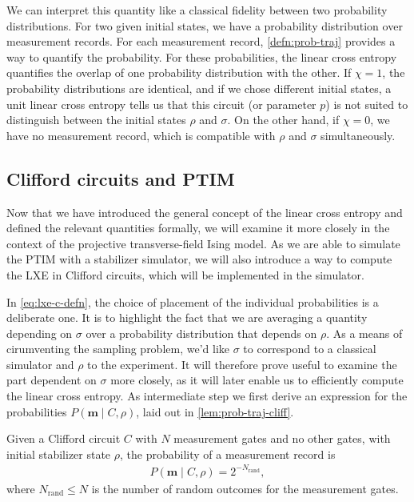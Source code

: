 We can interpret this quantity like a classical fidelity between two
probability distributions. For two given initial states, we have a probability
distribution over measurement records. For each measurement record,
\cref{defn:prob-traj} provides a way to quantify the probability. For these
probabilities, the linear cross entropy quantifies the overlap of one
probability distribution with the other. If $\chi = 1$, the probability
distributions are identical, and if we chose different initial states, a unit
linear cross entropy tells us that this circuit (or parameter $p$) is not
suited to distinguish between the initial states $\rho$ and $\sigma$. On the
other hand, if $\chi=0$, we have no measurement record, which is compatible
with $\rho$ and $\sigma$ simultaneously.

\subsection{Clifford circuits and PTIM}\label{sec:lxe-for-ptim}
Now that we have introduced the general concept of the linear cross entropy and
defined the relevant quantities formally, we will examine it more closely in
the context of the projective transverse-field Ising model. As we are able to
simulate the PTIM with a stabilizer simulator, we will also introduce a way to
compute the LXE in Clifford circuits, which will be implemented in the
simulator.

In \cref{eq:lxe-c-defn}, the choice of placement of the individual
probabilities is a deliberate one. It is to highlight the fact that we are
averaging a quantity depending on $\sigma$ over a probability distribution that
depends on $\rho$. As a means of cirumventing the sampling problem, we'd like
$\sigma$ to correspond to a classical simulator and $\rho$ to the experiment.
It will therefore prove useful to examine the part dependent on $\sigma$ more
closely, as it will later enable us to efficiently compute the linear cross
entropy.
As intermediate step we first derive an
expression for the probabilities $P\left( \mathbf{m} \mid C, \rho \right)$,
laid out in \cref{lem:prob-traj-cliff}.
\begin{lem}\label{lem:prob-traj-cliff}
  Given a Clifford circuit $C$ with $N$ measurement gates and no other gates, with initial
  stabilizer state $\rho$, the probability of a measurement record is
  \begin{align}
    P\left(\mathbf{m} \mid C, \rho\right) = 2^{-N_\mathrm{rand}}
  ,\end{align}
  where $N_\mathrm{rand} \leq N$ is the number of random outcomes for the
  measurement gates.
\end{lem}

